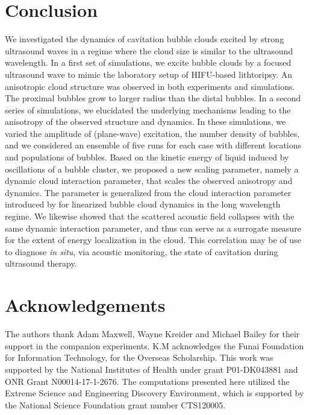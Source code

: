 \documentclass{jfm}
\begin{document}
\section{Conclusion}
\label{section:conc}
We investigated the dynamics of cavitation bubble clouds excited by strong ultrasound waves in a regime where the cloud size is similar to the ultrasound wavelength.
In a first set of simulations, we excite bubble clouds by a focused ultrasound wave to mimic the laboratory setup of HIFU-based lithtoripsy.
An anisotropic cloud structure was observed in both experiments and simulations.
The proximal bubbles grow to larger radius than the distal bubbles.
In a second series of simulations, we elucidated the underlying mechanisms leading to the anisotropy of the observed structure and dynamics. In these simulations, we varied the amplitude of (plane-wave) excitation, the number density of bubbles, and we considered an ensemble of five runs for each case with different locations and populations of bubbles.
Based on the kinetic energy of liquid induced by oscillations of a bubble cluster, we proposed a new scaling parameter, namely a dynamic cloud interaction parameter, that scales the observed anisotropy and dynamics.
The parameter is generalized from the cloud interaction parameter introduced by \citet{dAgostino89} for linearized bubble cloud dynamics in the long wavelength regime.
We likewise showed that the scattered acoustic field collapses with the same dynamic interaction parameter, and thus can serve as a surrogate measure for the extent of energy localization in the cloud.
This correlation may be of use to diagnose {\it in situ}, via acoustic monitoring, the state of cavitation during ultrasound therapy.

\section*{Acknowledgements}
The authors thank Adam Maxwell, Wayne Kreider and Michael Bailey for their support in the companion experiments. K.M acknowledges the Funai Foundation for Information Technology, for the Overseas Scholarship. This work was supported by the National Institutes of Health under grant P01-DK043881 and ONR Grant N00014-17-1-2676. The computations presented here utilized the Extreme Science and Engineering Discovery Environment, which is supported by the National Science Foundation grant number CTS120005.

\appendix
\end{document}
